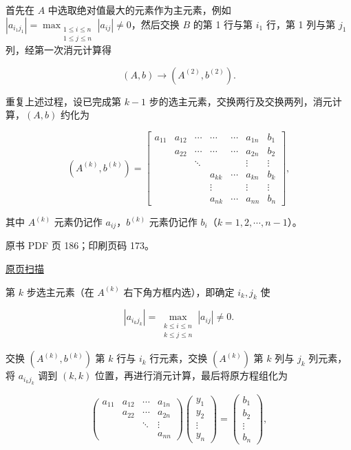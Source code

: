 首先在 \(A\) 中选取绝对值最大的元素作为主元素，例如 \(|a_{i_1j_1}|=\max_{\substack{1\le i\le n\\1\le j\le n}}|a_{ij}|\ne0\)，然后交换 \(B\) 的第 1 行与第 \(i_1\) 行，第 1 列与第 \(j_1\) 列，经第一次消元计算得

\[(A,b)\to(A^{(2)},b^{(2)}).\]

重复上述过程，设已完成第 \(k-1\) 步的选主元素，交换两行及交换两列，消元计算，\((A,b)\) 约化为

\[
(A^{(k)},b^{(k)})=\left[\begin{array}{cccccc|c}
a_{11}&a_{12}&\cdots&\cdots&\cdots&a_{1n}&b_1\\
&a_{22}&\cdots&\cdots&\cdots&a_{2n}&b_2\\
&&\ddots&&&\vdots&\vdots\\
&&&a_{kk}&\cdots&a_{kn}&b_k\\
&&&\vdots&&\vdots&\vdots\\
&&&a_{nk}&\cdots&a_{nn}&b_n
\end{array}\right],
\]

其中 \(A^{(k)}\) 元素仍记作 \(a_{ij}\)，\(b^{(k)}\) 元素仍记作 \(b_i\)（\(k=1,2,\cdots,n-1\)）。

\clearpage

原书 PDF 页 186；印刷页码 173。

\href{source-images/pdf-186.jpeg}{原页扫描}

第 \(k\) 步选主元素（在 \(A^{(k)}\) 右下角方框内选），即确定 \(i_k,j_k\) 使

\[|a_{i_kj_k}|=\max_{\substack{k\le i\le n\\k\le j\le n}}|a_{ij}|\ne0.\]

交换 \((A^{(k)},b^{(k)})\) 第 \(k\) 行与 \(i_k\) 行元素，交换 \((A^{(k)})\) 第 \(k\) 列与 \(j_k\) 列元素，将 \(a_{i_kj_k}\) 调到 \((k,k)\) 位置，再进行消元计算，最后将原方程组化为

\[
\begin{pmatrix}
a_{11}&a_{12}&\cdots&a_{1n}\\
&a_{22}&\cdots&a_{2n}\\
&&\ddots&\vdots\\
&&&a_{nn}
\end{pmatrix}
\begin{pmatrix}y_1\\y_2\\\vdots\\y_n\end{pmatrix}
=\begin{pmatrix}b_1\\b_2\\\vdots\\b_n\end{pmatrix},
\]

